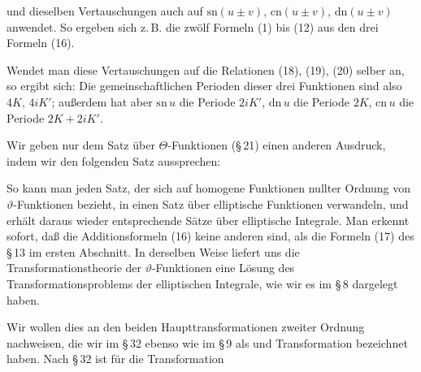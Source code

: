 und dieselben Vertauschungen auch auf $\mathrm{sn}(u \pm v)$, $\mathrm{cn}(u \pm v)$, $\mathrm{dn}(u \pm v)$ anwendet. So ergeben sich z.\,B. die zw\"olf Formeln (1) bis (12) aus den drei Formeln (16).

Wendet man diese Vertauschungen auf die Relationen (18), (19), (20) selber an, so ergibt sich:
Die gemeinschaftlichen Perioden dieser drei Funktionen sind also $4K$, $4iK'$; au\ss erdem hat aber $\mathrm{sn}\,u$ die Periode $2iK'$, $\mathrm{dn}\,u$ die Periode $2K$, $\mathrm{cn}\,u$ die Periode $2K + 2iK'$.

Wir geben nur dem Satz \"uber $\Theta$-Funktionen (\S\,21) einen anderen Ausdruck, indem wir den folgenden Satz aussprechen:


So kann man jeden Satz, der sich auf homogene Funktionen nullter Ordnung von $\vartheta$-Funktionen bezieht, in einen Satz \"uber elliptische Funktionen verwandeln, und erh\"alt daraus wieder entsprechende S\"atze \"uber elliptische Integrale. Man erkennt sofort, da\ss{} die Additionsformeln (16) keine anderen sind, als die Formeln (17) des \S\,13 im ersten Abschnitt. In derselben Weise liefert uns die Transformationstheorie der $\vartheta$-Funktionen eine L\"osung des  Transformationsproblems der elliptischen Integrale, wie wir es im \S\,8 dargelegt haben.

Wir wollen dies an den beiden Haupttransformationen zweiter Ordnung nachweisen, die wir im \S\,32 ebenso wie im \S\,9 als  und  Transformation bezeichnet haben. Nach \S\,32 ist f\"ur die  Transformation
